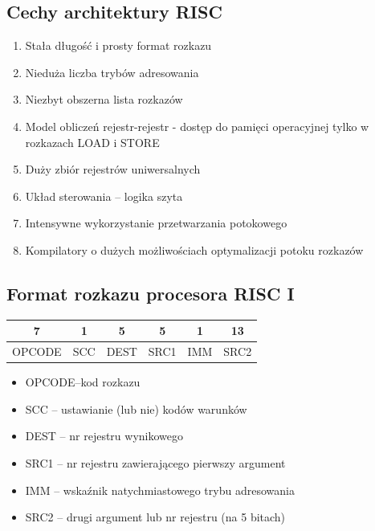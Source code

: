   	\subsection{Cechy architektury RISC}
   		\begin{enumerate}
   			\item Stała długość i prosty format rozkazu
   			\item Nieduża liczba trybów adresowania
   			\item Niezbyt obszerna lista rozkazów
   			\item Model obliczeń rejestr-rejestr - dostęp do pamięci operacyjnej tylko w rozkazach LOAD i STORE
   			\item Duży zbiór rejestrów uniwersalnych
   			\item Układ sterowania – logika szyta
   			\item Intensywne wykorzystanie przetwarzania potokowego
   			\item Kompilatory o dużych możliwościach optymalizacji potoku rozkazów
   		\end{enumerate}
  		
	\subsection{Format rozkazu procesora RISC I}
   		\begin{table}[h]
   			\begin{tabular}{clclll}
   				\hline
   				\multicolumn{1}{|c|}{7}      & \multicolumn{1}{c|}{1}   & \multicolumn{1}{c|}{5}    & \multicolumn{1}{c|}{5}    & \multicolumn{1}{c|}{1}   & \multicolumn{1}{c|}{13}   \\ \hline
   				\multicolumn{1}{|c|}{OPCODE} & \multicolumn{1}{c|}{SCC} & \multicolumn{1}{c|}{DEST} & \multicolumn{1}{c|}{SRC1} & \multicolumn{1}{c|}{IMM} & \multicolumn{1}{c|}{SRC2} \\ \hline
   			\end{tabular}
   		\end{table}
   		\begin{itemize}
   			\item OPCODE–kod rozkazu
   			\item SCC – ustawianie (lub nie) kodów warunków
   			\item DEST – nr rejestru wynikowego
   			\item SRC1 – nr rejestru zawierającego pierwszy argument
   			\item IMM – wskaźnik natychmiastowego trybu adresowania
   			\item SRC2 – drugi argument lub nr rejestru (na 5 bitach)
   		\end{itemize}
 		
